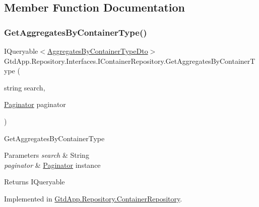 \subsection{Member Function Documentation}
\mbox{\label{interface_gtd_app_1_1_repository_1_1_interfaces_1_1_i_container_repository_a037098c03283c1907e38a7dbcc8a85f4}} 
\subsubsection{\texorpdfstring{Get\+Aggregates\+By\+Container\+Type()}{GetAggregatesByContainerType()}}
{\footnotesize\ttfamily I\+Queryable$<$\mbox{\hyperlink{class_gtd_app_1_1_data_1_1_dto_1_1_aggregates_by_container_type_dto}{Aggregates\+By\+Container\+Type\+Dto}}$>$ Gtd\+App.\+Repository.\+Interfaces.\+I\+Container\+Repository.\+Get\+Aggregates\+By\+Container\+Type (\begin{DoxyParamCaption}\item[{string}]{search,  }\item[{\mbox{\hyperlink{class_gtd_app_1_1_repository_1_1_paginator}{Paginator}}}]{paginator }\end{DoxyParamCaption})}



Get\+Aggregates\+By\+Container\+Type 


\begin{DoxyParams}{Parameters}
{\em search} & String\\
\hline
{\em paginator} & \mbox{\hyperlink{class_gtd_app_1_1_repository_1_1_paginator}{Paginator}} instance\\
\hline
\end{DoxyParams}
\begin{DoxyReturn}{Returns}
I\+Queryable
\end{DoxyReturn}


Implemented in \mbox{\hyperlink{class_gtd_app_1_1_repository_1_1_container_repository_a85e135cbb1410eacad9a58039831b04c}{Gtd\+App.\+Repository.\+Container\+Repository}}.


